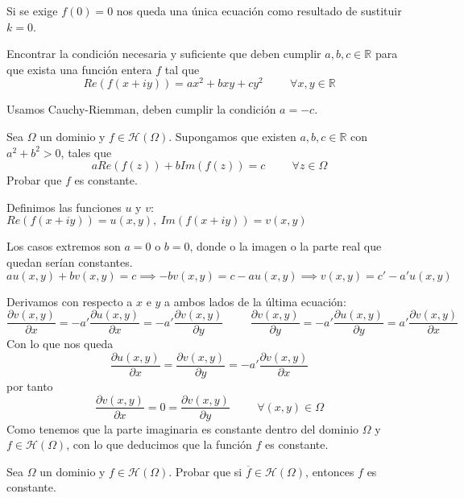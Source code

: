 Si se exige $f(0)=0$ nos queda una única ecuación como resultado de sustituir $k=0$.


\begin{ejer}
	Encontrar la condición necesaria y suficiente que deben cumplir $a,b,c\in\mathbb{R}$ para que exista una función entera $f$ tal que
	$$ Re(f(x+iy)) = ax^2+bxy+cy^2\hspace{1cm}\forall x,y\in\mathbb{R} $$
\end{ejer}
Usamos Cauchy-Riemman, deben cumplir la condición $a=-c$.


\begin{ejer}
	Sea $\Omega$ un dominio y $f\in\mathcal{H}(\Omega)$. Supongamos que existen $a,b,c\in\mathbb{R}$ con $a^2+b^2>0$, tales que
	$$ aRe(f(z)) + bIm(f(z)) = c\hspace{1cm} \forall z\in\Omega $$
	Probar que $f$ es constante.
\end{ejer}

\begin{sol}

Definimos las funciones $u$ y $v$: 
$Re(f(x+iy)) = u(x,y), \ Im(f(x+iy)) = v(x,y)$

Los casos extremos son $a=0$ o $b=0$, donde o la imagen o la parte real que quedan serían constantes.
$au(x,y)+bv(x,y)=c \implies -bv(x,y) = c-au(x,y) \implies v(x,y)= c'-a'u(x,y)$

Derivamos con respecto a $x$ e $y$ a ambos lados de la última ecuación:
$$\frac{\partial v(x,y)}{\partial x} = -a' \frac{\partial u(x,y)}{\partial x} = -a' \frac{\partial v(x,y)}{\partial y} \hspace{1cm} \frac{\partial v(x,y)}{\partial y} = -a' \frac{\partial u(x,y)}{\partial y} = a' \frac{\partial v(x,y)}{\partial x}$$
Con lo que nos queda
$$\frac{\partial u (x,y)}{\partial x} = \frac{\partial v(x,y)}{\partial y} = -a'\frac{\partial v(x,y)}{\partial x}$$
por tanto
$$\frac{\partial v(x,y)}{\partial x} = 0 = \frac{\partial v(x,y)}{\partial y} \hspace{1cm}\forall (x,y)\in\Omega$$
Como tenemos que la parte imaginaria es constante dentro del dominio $\Omega$ y $f\in\mathcal{H}(\Omega)$, con lo que deducimos que la función $f$ es constante.
\end{sol}



\begin{ejer}
	Sea $\Omega$ un dominio y $f\in\mathcal{H}(\Omega)$. Probar que si $\overline{f}\in\mathcal{H}(\Omega)$, entonces $f$ es constante.
\end{ejer}


